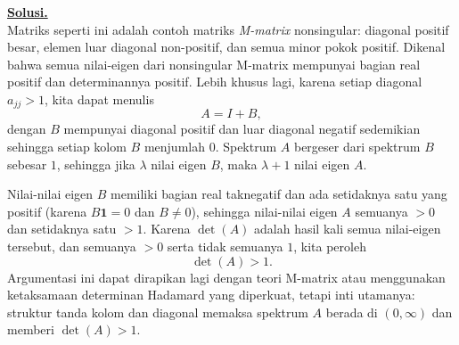 \documentclass[12pt,twoside]{article}
\newenvironment{solution}
{
	\par\noindent\textbf{\underline{Solusi.}}\\
}
{
	\par
}
\begin{document}
\begin{enumerate}
\begin{solution}
          Matriks seperti ini adalah contoh matriks \emph{M-matrix} nonsingular: diagonal positif besar, elemen luar diagonal non-positif, dan semua minor pokok positif. Dikenal bahwa semua nilai-eigen dari nonsingular M-matrix mempunyai bagian real positif dan determinannya positif. Lebih khusus lagi, karena setiap diagonal $a_{jj}>1$, kita dapat menulis
          \[
            A=I+B,
          \]
          dengan $B$ mempunyai diagonal positif dan luar diagonal negatif sedemikian sehingga setiap kolom $B$ menjumlah $0$. Spektrum $A$ bergeser dari spektrum $B$ sebesar $1$, sehingga jika $\lambda$ nilai eigen $B$, maka $\lambda+1$ nilai eigen $A$.

          Nilai-nilai eigen $B$ memiliki bagian real taknegatif dan ada setidaknya satu yang positif (karena $B\mathbf1=0$ dan $B\ne0$), sehingga nilai-nilai eigen $A$ semuanya $>0$ dan setidaknya satu $>1$. Karena $\det(A)$ adalah hasil kali semua nilai-eigen tersebut, dan semuanya $>0$ serta tidak semuanya $1$, kita peroleh
          \[
            \det(A)>1.
          \]
          Argumentasi ini dapat dirapikan lagi dengan teori M-matrix atau menggunakan ketaksamaan determinan Hadamard yang diperkuat, tetapi inti utamanya: struktur tanda kolom dan diagonal memaksa spektrum $A$ berada di $(0,\infty)$ dan memberi $\det(A)>1$.
        \end{solution}
\end{enumerate}
\newpage
\end{document}
